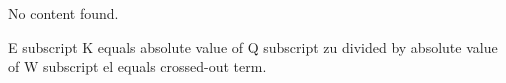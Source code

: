 No content found.

E subscript K equals absolute value of Q subscript zu divided by absolute value of W subscript el equals crossed-out term.
